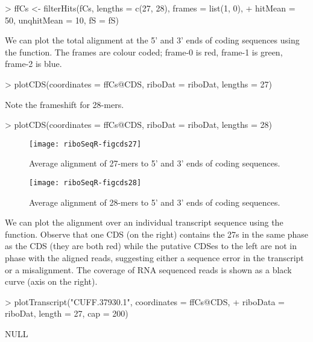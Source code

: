 \documentclass[a4paper]{article}
\begin{document}
\begin{Schunk}
\begin{Sinput}
> ffCs <- filterHits(fCs, lengths = c(27, 28), frames = list(1, 0), 
+                    hitMean = 50, unqhitMean = 10, fS = fS)
\end{Sinput}
\end{Schunk}

We can plot the total alignment at the 5' and 3' ends of coding sequences using the  function. The frames are colour coded; frame-0 is red, frame-1 is green, frame-2 is blue. 
\begin{Schunk}
\begin{Sinput}
> plotCDS(coordinates = ffCs@CDS, riboDat = riboDat, lengths = 27)
\end{Sinput}
\end{Schunk}
Note the frameshift for 28-mers.
\begin{Schunk}
\begin{Sinput}
> plotCDS(coordinates = ffCs@CDS, riboDat = riboDat, lengths = 28)
\end{Sinput}
\end{Schunk}

\begin{figure}[!ht]
\centering
\texttt{[image: riboSeqR-figcds27]}
\label{fig:cds27}
\caption{Average alignment of 27-mers to 5' and 3' ends of coding sequences.}
\end{figure}


\begin{figure}[!ht]
\centering
\texttt{[image: riboSeqR-figcds28]}
\label{fig:cds28}
\caption{Average alignment of 28-mers to 5' and 3' ends of coding sequences.}
\end{figure}



We can plot the alignment over an individual transcript sequence using the  function. Observe that one CDS (on the right) contains the 27s in the same phase as the CDS (they are both red) while the putative CDSes to the left are not in phase with the aligned reads, suggesting either a sequence error in the transcript or a misalignment. The coverage of RNA sequenced reads is shown as a black curve (axis on the right).
\begin{Schunk}
\begin{Sinput}
> plotTranscript("CUFF.37930.1", coordinates = ffCs@CDS, 
+                riboData = riboDat, length = 27, cap = 200)               
\end{Sinput}
\begin{Soutput}
NULL
\end{Soutput}
\end{Schunk}
\end{document}
